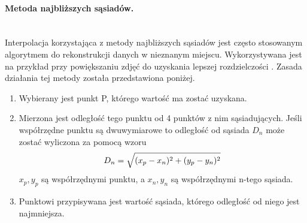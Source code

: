 \paragraph{Metoda najbliższych sąsiadów.\newline}\\
Interpolacja korzystająca z metody najbliższych sąsiadów jest często stosowanym algorytmem do rekonstrukcji danych w nieznanym miejscu. Wykorzystywana jest na przykład przy powiększaniu zdjęć do uzyskania lepszej rozdzielczości \cite{han2013comparison}. Zasada działania tej metody została przedstawiona poniżej.
\begin{enumerate}
    \item Wybierany jest punkt P, którego wartość ma zostać uzyskana.
    \item Mierzona jest odległość tego punktu od 4 punktów z nim sąsiadujących. Jeśli współrzędne punktu są dwuwymiarowe to odległość od sąsiada $D_{n}$ może zostać wyliczona za pomocą wzoru 
    \begin{equation}
             D_{n}=\sqrt{(x_{p}-x_{n})^2+(y_{p}-y_{n})^2}    \\
\end{equation}
$x_{p},y_{p}$ są współrzędnymi punktu, a $x_{n},y_{n}$ są współrzędnymi n-tego sąsiada.
    \item Punktowi przypisywana jest wartość sąsiada, którego odległość od niego jest najmniejsza.
\end{enumerate}
